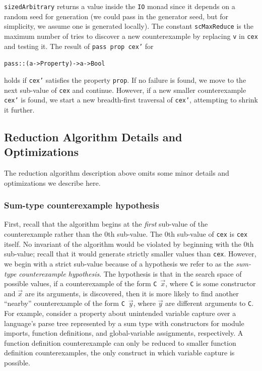 \documentclass[10pt]{sigplanconf}
\newenvironment{code}{\begin{alltt}}{\end{alltt}}
\newcommand{\ttp}[1]{\texttt{#1}}
\begin{document}

\ttp{sizedArbitrary} returns a value inside the \ttp{IO} monad since it depends
on a random seed for generation (we could pass in the generator seed, but for
simplicity, we assume one is generated locally).  The constant \ttp{scMaxReduce} is
the maximum number of tries to discover a new counterexample by replacing
\ttp{v} in \ttp{cex} and testing it.  The result of \ttp{pass prop cex'} for
%
\begin{code}
pass :: (a -> Property) -> a -> Bool
\end{code}
%
\noindent
holds if \ttp{cex'} satisfies the property \ttp{prop}.  If no failure is found,
we move to the next sub-value of \ttp{cex} and continue.  However, if a new
smaller counterexample \ttp{cex'} is found, we start a new breadth-first
traversal of \ttp{cex'}, attempting to shrink it further.

\subsection{Reduction Algorithm Details and Optimizations}
The reduction algorithm description above omits some minor details and
optimizations we describe here.

\subsubsection{Sum-type counterexample hypothesis}
First, recall that the algorithm begins at the \emph{first} sub-value of the
counterexample rather than the 0th sub-value.  The 0th sub-value of \ttp{cex} is
\ttp{cex} itself.  No invariant of the algorithm would be violated by beginning
with the 0th sub-value; recall that it would generate strictly smaller values
than \ttp{cex}.  However, we begin with a strict sub-value because of a
hypothesis we refer to as the \emph{sum-type counterexample hypothesis}.  The
hypothesis is that in the search space of possible values, if a counterexample
of the form \ttp{C}~$\vec{x}$, where \ttp{C} is some constructor and $\vec{x}$
are its arguments, is discovered, then it is more likely to find another
``nearby'' counterexample of the form \ttp{C}~$\vec{y}$, where $\vec{y}$ are
different arguments to \ttp{C}.  For example, consider a property about
unintended variable capture over a language's parse tree represented by a sum
type with constructors for module imports, function definitions, and
global-variable assignments, respectively.  A function definition counterexample
can only be reduced to smaller function definition counterexamples, the only
construct in which variable capture is possible.
\end{document}
